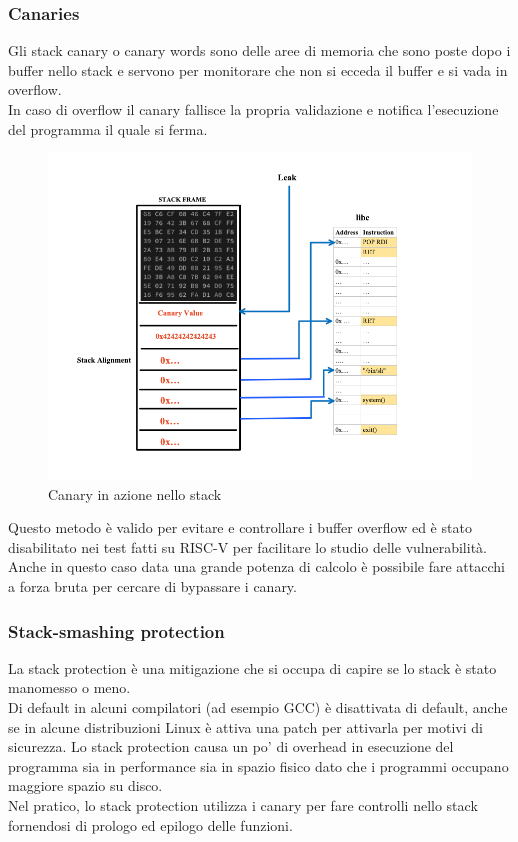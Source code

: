\subsubsection*{Canaries}
Gli stack canary o canary words sono delle aree di memoria che sono poste dopo i buffer nello stack e servono per monitorare che non si ecceda il buffer e si vada in overflow.\\
In caso di overflow il canary fallisce la propria validazione e notifica l'esecuzione del programma il quale si ferma.
\vspace{1cm}
\FloatBarrier
\begin{figure}[!htbp]
    \centering
    \includegraphics[width=1\linewidth]{images/canary.png}
    \caption{Canary in azione nello stack}
\end{figure}
\FloatBarrier
\vspace{1cm}
Questo metodo è valido per evitare e controllare i buffer overflow ed è stato disabilitato nei test fatti su RISC-V per facilitare lo studio delle vulnerabilità. Anche in questo caso data una grande potenza di calcolo è possibile fare attacchi a forza bruta per cercare di bypassare i canary.
\subsubsection*{Stack-smashing protection}
La stack protection è una mitigazione che si occupa di capire se lo stack è stato manomesso o meno. \\
\newline
Di default in alcuni compilatori (ad esempio GCC) è disattivata di default, anche se in alcune distribuzioni Linux è attiva una patch per attivarla per motivi di sicurezza. Lo stack protection causa un po' di overhead in esecuzione del programma sia in performance sia in spazio fisico dato che i programmi occupano maggiore spazio su disco.\\
\newline
Nel pratico, lo stack protection utilizza i canary per fare controlli nello stack fornendosi di prologo ed epilogo delle funzioni.
